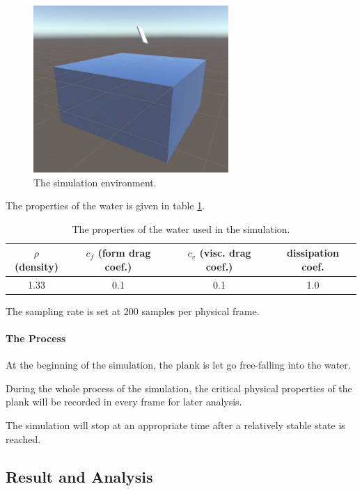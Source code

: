 \begin{figure}[h]
	\centering
	\includegraphics[height=2.5in]{figures/experiment-environment.jpg}
	\caption{The simulation environment.}
	\label{simulation-environment}
\end{figure}

The properties of the water is given in table \ref{simulation-water-properties}.

\begin{table}[h]
	\centering
	\begin{tabular}{ c c c c }
		\hline
		$\rho$ {\footnotesize(density)} & $c_f$ {\footnotesize(form drag coef.)} & $c_v$ {\footnotesize(visc. drag coef.)} & {\small dissipation coef.} \\
		\hline
		1.33 & 0.1 & 0.1 & 1.0 \\
		\hline
	\end{tabular}
	\caption{The properties of the water used in the simulation.}
	\label{simulation-water-properties}
\end{table}

The sampling rate is set at 200 samples per physical frame.

\paragraph{The Process}

At the beginning of the simulation, the plank is let go free-falling into the water.

During the whole process of the simulation, the critical physical properties of the plank will be recorded in every frame for later analysis.

The simulation will stop at an appropriate time after a relatively stable state is reached.

\subsection{Result and Analysis}

